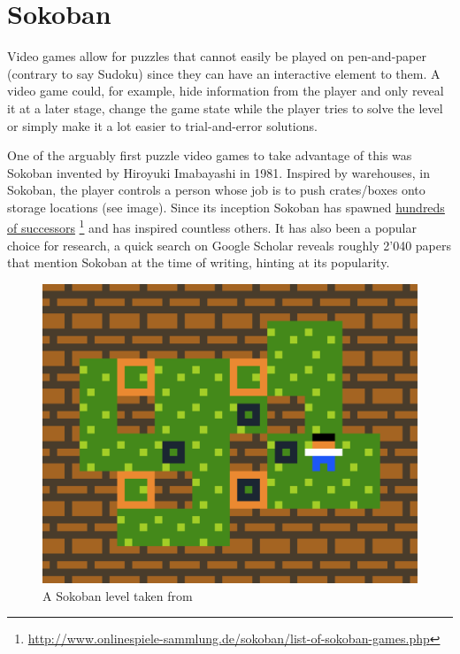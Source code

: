 


\section{Sokoban}

Video games allow for puzzles that cannot easily be played on pen-and-paper (contrary to say Sudoku) since they can have an interactive element to them. A video game could, for example, hide information from the player and only reveal it at a later stage, change the game state while the player tries to solve the level or simply make it a lot easier to trial-and-error solutions.


One of the arguably first puzzle video games to take advantage of this was Sokoban invented by Hiroyuki Imabayashi in 1981. Inspired by warehouses, in Sokoban, the player controls a person whose job is to push crates/boxes onto storage locations (see image). Since its inception Sokoban has spawned \href{http://www.onlinespiele-sammlung.de/sokoban/list-of-sokoban-games.php}{hundreds of successors} \footnote{\url{http://www.onlinespiele-sammlung.de/sokoban/list-of-sokoban-games.php}} and has inspired countless others. It has also been a popular choice for research, a quick search on Google Scholar reveals roughly 2'040 papers that mention Sokoban at the time of writing, hinting at its popularity.

\begin{figure}[h]
    \centering
    \setlength{\tabcolsep}{0.0130\linewidth}
    \includegraphics[width=0.487\linewidth]{figures/45minslevel.png}
    
    \caption[43 Minute Sokoban level]{A Sokoban level taken from \cite{Pelanek2011} %
      \label{fig:43minsfig}}
\end{figure}

